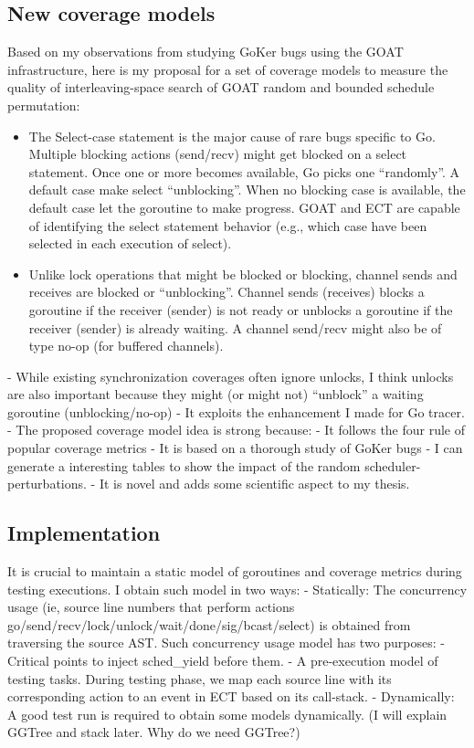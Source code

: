 \subsection{New coverage models}
Based on my observations from studying GoKer bugs using the GOAT infrastructure, here is my proposal for a set of coverage models to measure the quality of interleaving-space search of GOAT random and bounded schedule permutation:
\begin{itemize}
  \item The Select-case statement is the major cause of rare bugs specific to Go. Multiple blocking actions (send/recv) might get blocked on a select statement. Once one or more becomes available, Go picks one “randomly”. A default case make select “unblocking”. When no blocking case is available, the default case let the goroutine to make progress. GOAT and ECT are capable of identifying the select statement behavior (e.g., which case have been selected in each execution of select).
  \item Unlike lock operations that might be blocked  or blocking, channel sends and receives are blocked or “unblocking”. Channel sends (receives) blocks a goroutine if the receiver (sender) is not ready or unblocks a goroutine if the receiver (sender) is already waiting. A channel send/recv might also be of type no-op (for buffered channels).

\end{itemize}

-	While existing synchronization coverages often ignore unlocks, I think unlocks are also important because they might (or might not) “unblock” a waiting goroutine (unblocking/no-op)
- It exploits the enhancement I made for Go tracer.
- The proposed coverage model idea is strong because:
- It follows the four rule of popular coverage metrics
- It is based on a thorough study of GoKer bugs
- I can generate a interesting tables to show the impact of the random scheduler-perturbations.
- It is novel and adds some scientific aspect to my thesis.

\subsection{Implementation}
It is crucial to maintain a static model of goroutines and coverage metrics during testing executions. I obtain such model in two ways:
-	Statically: The concurrency usage (ie, source line numbers that perform actions go/send/recv/lock/unlock/wait/done/sig/bcast/select) is obtained from traversing the source AST. Such concurrency usage model has two purposes:
- Critical points to inject sched\_yield before them.
- A pre-execution model of testing tasks. During testing phase, we map each source line with its corresponding action to an event in ECT based on its call-stack.
-	Dynamically: A good test run is required to obtain some models dynamically. (I will explain GGTree and stack later. Why do we need GGTree?)




